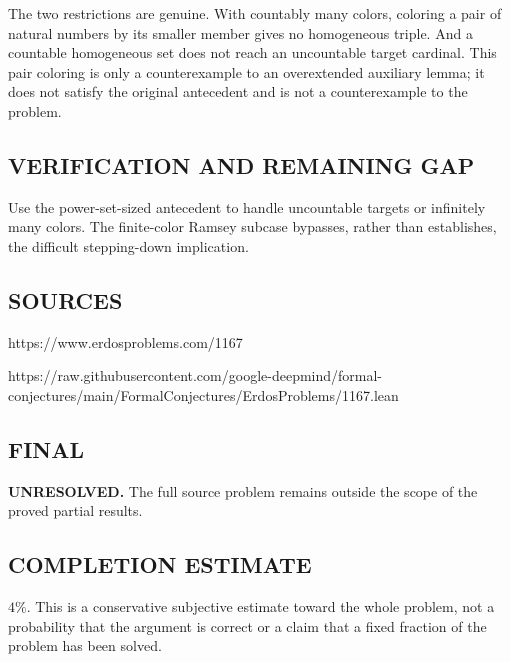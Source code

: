 The two restrictions are genuine. With countably many colors, coloring a pair
of natural numbers by its smaller member gives no homogeneous triple. And a
countable homogeneous set does not reach an uncountable target cardinal.
This pair coloring is only a counterexample to an overextended auxiliary lemma;
it does not satisfy the original antecedent and is not a counterexample to the problem.

\subsection*{VERIFICATION AND REMAINING GAP}
Use the power-set-sized antecedent to handle uncountable targets or infinitely
many colors. The finite-color Ramsey subcase bypasses, rather than establishes,
the difficult stepping-down implication.

\subsection*{SOURCES}
https://www.erdosproblems.com/1167

https://raw.githubusercontent.com/google-deepmind/formal-conjectures/main/FormalConjectures/ErdosProblems/1167.lean

\subsection*{FINAL}
\textbf{UNRESOLVED.} The full source problem remains outside the scope of the proved partial results.

\subsection*{COMPLETION ESTIMATE}
$4\%$. This is a conservative subjective estimate toward the whole problem, not a probability that the argument is correct or a claim that a fixed fraction of the problem has been solved.
